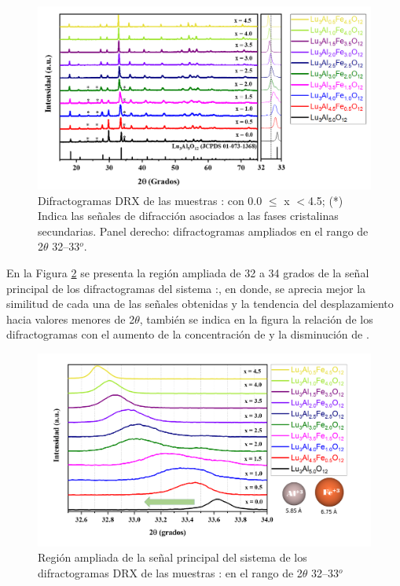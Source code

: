 \begin{figure}[h]
    \centering%

    \includegraphics[width=\textwidth]{Kap3/PatronesDRX.png}%
    \caption{Difractogramas DRX de las muestras
    : con 0.0 $\leq$ x $<$4.5; (*)
    Indica las
    señales de difracción asociados a las fases cristalinas secundarias.
    Panel
    derecho:  difractogramas ampliados en el rango de 2$\theta$ 32–33$^o$.}
    \label{fig:patDRX}
\end{figure}

En la Figura \ref{fig:DRXamp} se presenta la región ampliada de 32 a 34 grados
de la señal principal de los difractogramas del sistema
:, en donde, se aprecia mejor la similitud
de cada una de las señales obtenidas y la tendencia del desplazamiento hacia
valores menores de 2$\theta$, también se indica en la figura la relación de los
difractogramas con el aumento de la concentración de  y la
disminución de .

\begin{figure}[h]
    \centering%

    \includegraphics[width=\textwidth]{Kap3/DRXampliado.png}%
    \caption{Región ampliada de la señal principal del sistema de los
    difractogramas DRX de las muestras : en el rango
    de
    2$\theta$ 32–33$^o$} \label{fig:DRXamp}
\end{figure}

